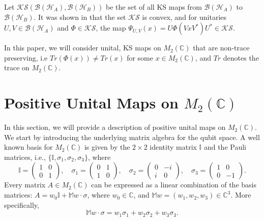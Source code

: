\documentclass[11pt,reqno]{amsart}
\theoremstyle{definition}
\numberwithin{equation}{section} \setcounter{tocdepth}{1}
\def\bm{{\mathbb M}}
\numberwithin{equation}{section}
\begin{document}
\noindent Let $\mathcal{KS}(\mathcal{B}(\mathcal{H}_A), \mathcal{B}(\mathcal{H}_B))$ be the set of all KS maps from $\mathcal{B}(\mathcal{H}_A)$ to $\mathcal{B}(\mathcal{H}_B)$. It was shown in \cite{MA2010} that the set $\mathcal{KS}$ is convex, and for unitaries $U,V \in \mathcal{B}(\mathcal{H}_A)$ and $\Phi \in \mathcal{KS}$, the map $\Psi_{U,V}(x)=U\Phi(VxV^*)U^* \in \mathcal{KS}.$




\noindent In this paper, we will consider unital, KS maps on $M_2(\mathbb{C})$ that are non-trace preserving, i.e $Tr(\Phi(x))\neq Tr(x)$ for some $x\in M_2(\mathbb{C})$, and $Tr$ denotes the trace on $M_2(\mathbb{C})$.\\

 \section{Positive Unital Maps on $M_2(\mathbb{C})$}
 In this section, we will provide a description of positive unital maps on $M_2(\mathbb{C})$. We start by introducing the underlying matrix algebra for the qubit space.
 A well known basis for $M_2(\mathbb{C})$ is given by the $2\times 2$ identity matrix $\mathbb{I}$ and the Pauli matrices, i.e., $\{\mathbb{I}, \sigma_1, \sigma_2, \sigma_3 \}$, where
 \begin{equation}
 \mathbb{I}=\begin{pmatrix}
     1 & 0\\
     0 & 1
 \end{pmatrix}, \quad \sigma_1=\begin{pmatrix}
     0 & 1\\
     1 & 0
 \end{pmatrix}, \quad \sigma_2=\begin{pmatrix}
     0 & -i\\
     i & 0
 \end{pmatrix}, \quad \sigma_3=\begin{pmatrix}
     1 & 0\\
     0 & -1
 \end{pmatrix}.
 \end{equation}
 \noindent Every matrix $A\in M_2(\mathbb{C})$ can be expressed as a linear combination of the basis matrices: $A=w_0\mathbb{I} + \bm{w} \cdot \sigma$, where $w_0 \in \mathbb{C}$, and $\bm{w}=(w_1, w_2, w_3) \in \mathbb{C}^3.$ More specifically, \begin{equation}
      \bm{w} \cdot \sigma=w_1\sigma_1+w_2\sigma_2+w_3\sigma_3.
  \end{equation}
\end{document}

